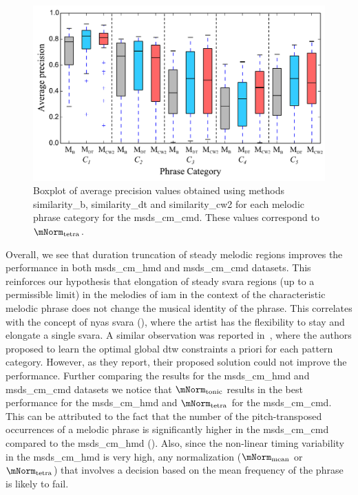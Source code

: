 \begin{figure}
	\begin{center}
		\includegraphics[width=\figSizeHundred]{ch06_patterns/figures/ImprovingSimilarity/CarnaticPerCategoryPerformance_BOXPLOT.pdf}
	\end{center}
	\caption[Boxplot of average precision for different types of melodic patterns in the Carnatic music dataset]{Boxplot of average precision values obtained using methods \acrshort{similarity_b}, \acrshort{similarity_dt} and \acrshort{similarity_cw2} for each melodic phrase category for the \acrshort{msds_cm_cmd}. These values correspond to $\mNorm_\mathrm{tetra}$.}
	\label{fig:carnaticPerCategoryPerformance}
\end{figure}


Overall, we see that duration truncation of steady melodic regions improves the performance in both \acrshort{msds_cm_hmd} and \acrshort{msds_cm_cmd} datasets. This reinforces our hypothesis that elongation of steady \gls{svara} regions (up to a permissible limit) in the melodies of \gls{iam} in the context of the characteristic melodic phrase does not change the musical identity of the phrase. This correlates with the concept of \gls{nyas} \gls{svara} (), where the artist has the flexibility to stay and elongate a single \gls{svara}. A similar observation was reported in~\cite{Rao2014}, where the authors proposed to learn the optimal global \gls{dtw} constraints a priori for each pattern category. However, as they report, their proposed solution could not improve the performance. Further comparing the results for the \acrshort{msds_cm_hmd} and \acrshort{msds_cm_cmd} datasets we notice that $\mNorm_\mathrm{tonic}$ results in the best performance for the \acrshort{msds_cm_hmd} and $\mNorm_\mathrm{tetra}$ for the \acrshort{msds_cm_cmd}. This can be attributed to the fact that the number of the pitch-transposed occurrences of a melodic phrase is significantly higher in the \acrshort{msds_cm_cmd} compared to the \acrshort{msds_cm_hmd} (). Also, since the non-linear timing variability in the \acrshort{msds_cm_hmd} is very high, any normalization ($\mNorm_\mathrm{mean}$ or $\mNorm_\mathrm{tetra}$) that involves a decision based on the mean frequency of the phrase is likely to fail.


